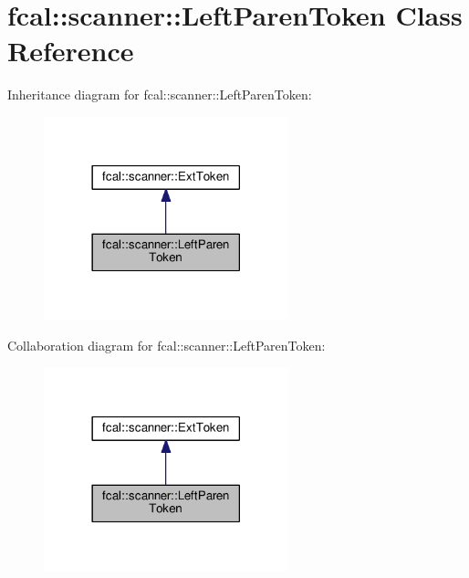 \hypertarget{classfcal_1_1scanner_1_1LeftParenToken}{}\section{fcal\+:\+:scanner\+:\+:Left\+Paren\+Token Class Reference}
\label{classfcal_1_1scanner_1_1LeftParenToken}


Inheritance diagram for fcal\+:\+:scanner\+:\+:Left\+Paren\+Token\+:
\nopagebreak
\begin{figure}[H]
\begin{center}
\leavevmode
\includegraphics[width=201pt]{classfcal_1_1scanner_1_1LeftParenToken__inherit__graph}
\end{center}
\end{figure}


Collaboration diagram for fcal\+:\+:scanner\+:\+:Left\+Paren\+Token\+:
\nopagebreak
\begin{figure}[H]
\begin{center}
\leavevmode
\includegraphics[width=201pt]{classfcal_1_1scanner_1_1LeftParenToken__coll__graph}
\end{center}
\end{figure}
